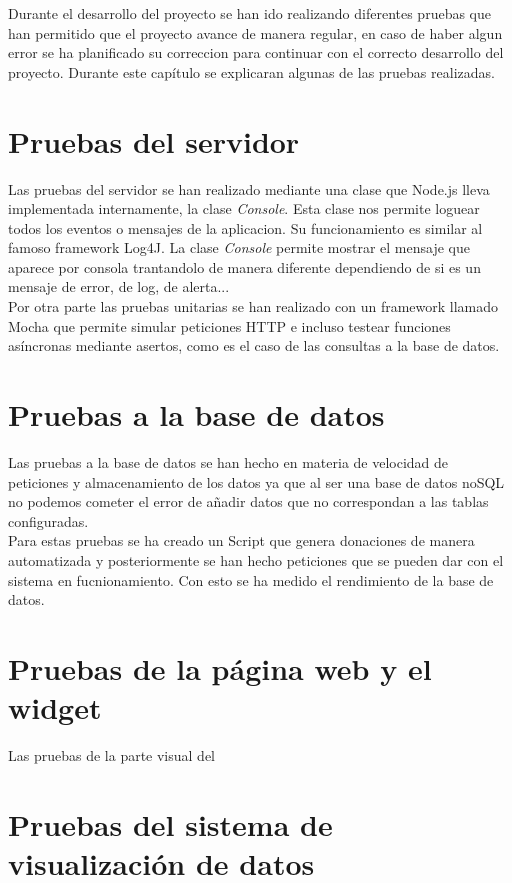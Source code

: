 Durante el desarrollo del proyecto se han ido realizando diferentes pruebas que han permitido que el proyecto avance de manera regular, en caso de haber algun error se ha planificado su correccion para continuar con el correcto desarrollo del proyecto. Durante este capítulo se explicaran algunas de las pruebas realizadas.

\section{Pruebas del servidor}
Las pruebas del servidor se han realizado mediante una clase que Node.js lleva implementada internamente, la clase \textit{Console}. Esta clase nos permite loguear todos los eventos o mensajes de la aplicacion. Su funcionamiento es similar al famoso framework Log4J. La clase \textit{Console} permite mostrar el mensaje que aparece por consola trantandolo de manera diferente dependiendo de si es un mensaje de error, de log, de alerta...\\

Por otra parte las pruebas unitarias se han realizado con un framework llamado Mocha que permite simular peticiones HTTP e incluso testear funciones asíncronas mediante asertos, como es el caso de las consultas a la base de datos.

\section{Pruebas a la base de datos}
Las pruebas a la base de datos se han hecho en materia de velocidad de peticiones y almacenamiento de los datos ya que al ser una base de datos noSQL no podemos cometer el error de añadir datos que no correspondan a las tablas configuradas.\\

Para estas pruebas se ha creado un Script que genera donaciones de manera automatizada y posteriormente se han hecho peticiones que se pueden dar con el sistema en fucnionamiento. Con esto se ha medido el rendimiento de la base de datos.

\section{Pruebas de la página web y el widget}
Las pruebas de la parte visual del 

\section{Pruebas del sistema de visualización de datos}